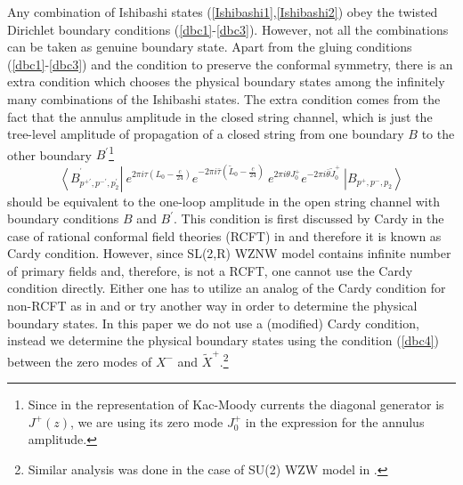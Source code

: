 \documentclass[a4paper,12pt]{article}
\begin{document}
Any combination of Ishibashi states
(\ref{Ishibashi1},\ref{Ishibashi2}) obey the twisted Dirichlet
boundary conditions (\ref{dbc1}-\ref{dbc3}). However, not all the
combinations can be taken as genuine boundary state. Apart from
the gluing conditions (\ref{dbc1}-\ref{dbc3}) and the condition to
preserve the conformal symmetry, there is an extra condition which
chooses the physical boundary states among the infinitely many
combinations of the Ishibashi states. The extra condition comes
from the fact that the annulus amplitude in the closed string
channel, which is just the tree-level amplitude of propagation of
a closed string from one boundary $B$ to the other
boundary $B^{\prime }$\footnote{%
Since in the representation of Kac-Moody currents the diagonal generator is $%
J^{+}(z)$, we are using its zero mode $J_{0}^{+}$ in the expression for the
annulus amplitude.}
\begin{equation}
\left\langle B_{p^{+\prime },p^{-\prime },p_{2}^{\prime }}^{^{\prime
}}\right| \ e^{2\pi i\tau (L_{0}-\frac{c}{24})}e^{-2\pi i\bar{\tau}(\tilde{L}%
_{0}-\frac{c}{24})}\ e^{2\pi i\theta J_{0}^{+}}e^{-2\pi i\bar{\theta}\tilde{J}%
_{0}^{+}}\ \left| B_{p^{+},p^{-},p_{2}}\right\rangle  \label{annulus}
\end{equation}
should be equivalent to the one-loop amplitude in the open string channel
with boundary conditions $B$ and $B^{\prime }$. This condition is first
discussed by Cardy in the case of rational conformal field theories (RCFT)
in \cite{cardy} and therefore it is known as Cardy condition. However, since
SL(2,R) WZNW model contains infinite number of primary fields and,
therefore, is not a RCFT, one cannot use the Cardy condition directly.
Either one has to utilize an analog of the Cardy condition for non-RCFT as
in \cite{teschner-0} and \cite{teschner} or try another way in order to
determine the physical boundary states. In this paper we do not use a
(modified) Cardy condition, instead we determine the physical boundary
states using the condition (\ref{dbc4}) between the zero modes of $X^{-}$
and $\tilde{X}^{+}$.\footnote{%
Similar analysis was done in the case of SU(2) WZW model in \cite{ishikawa}.}
\end{document}
